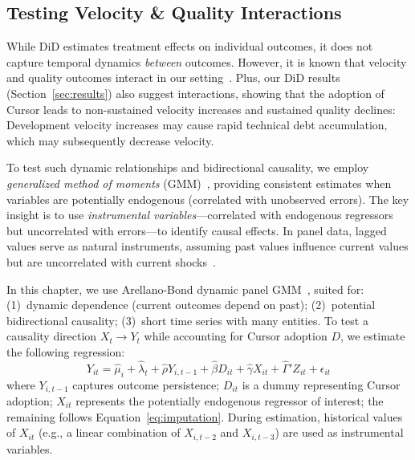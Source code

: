 \subsection{Testing Velocity \& Quality Interactions}
\label{sec:interaction}

While DiD estimates treatment effects on individual outcomes, it does not capture temporal dynamics \textit{between} outcomes. 
However, it is known that velocity and quality outcomes interact in our setting~\cite{DBLP:conf/sigsoft/ChengMCJGKZ022, besker2018technical}. 
Plus, our DiD results (Section~\ref{sec:results}) also suggest interactions, showing that the adoption of Cursor leads to non-sustained velocity increases and sustained quality declines: Development velocity increases may cause rapid technical debt accumulation, which may subsequently decrease velocity.

To test such dynamic relationships and bidirectional causality, we employ \emph{generalized method of moments} (GMM)~\cite{hansen1982large}, providing consistent estimates when variables are potentially endogenous (correlated with unobserved errors). 
The key insight is to use \emph{instrumental variables}---correlated with endogenous regressors but uncorrelated with errors---to identify causal effects.
In panel data, lagged values serve as natural instruments, assuming past values influence current values but are uncorrelated with current shocks~\cite{arellano1991some}.

In this chapter, we use Arellano-Bond dynamic panel GMM~\cite{arellano1991some}, suited for: (1)~dynamic dependence (current outcomes depend on past); (2)~potential bidirectional causality; (3)~short time series with many entities.
To test a causality direction $X_t \to Y_t$ while accounting for Cursor adoption $D$, we estimate the following regression:
\begin{equation}
\label{eq:dynamic-gmm}
Y_{it} = \hat\mu_i + \hat\lambda_t + \hat\rho Y_{i,t-1} + \hat\beta D_{it} + \hat\gamma X_{it} + \hat{\Gamma}' Z_{it} +\epsilon_{it}
\end{equation}
where $Y_{i,t-1}$ captures outcome persistence; $D_{it}$ is a dummy representing Cursor adoption; $X_{it}$ represents the potentially endogenous regressor of interest; the remaining follows Equation~\ref{eq:imputation}. During estimation, historical values of $X_{it}$ (e.g., a linear combination of $X_{i,t-2}$ and $X_{i,t-3}$) are used as instrumental variables.

